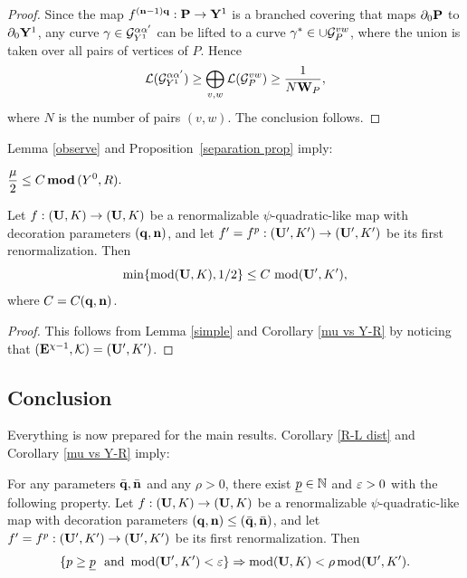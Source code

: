 \begin{proof}
   Since the map $f^{({\mathbf{n}}-1){\mathbf{q}}}: {\mathbf{P}}\rightarrow {\mathbf{Y}}^1$ is a branched covering
that maps $\partial_0{\mathbf{P}}$ to  $\partial_0{\mathbf{Y}}^1$, any curve
$\gamma\in {\mathcal G}_{Y^1}^{\alpha \alpha'}$ can be lifted to a curve
$\gamma^*\in \cup{\mathcal G}_P^{vw}$, where the union is taken over all pairs of vertices of $P$.
Hence
$$
 {\mathcal L} ({\mathcal G}_{Y^1}^{\alpha \alpha'}) \geq \bigoplus_{v,w} {\mathcal L}({\mathcal G}_P^{vw})\geq \frac{1}{N{\mathbf{W}}_P},
$$
where $N$ is the number of pairs $(v,w)$.
The conclusion follows.
\end{proof}

 Lemma \ref{observe} and Proposition~\ref{separation prop} imply:

\begin{cor}\label{mu vs Y-R}
   $\displaystyle{\frac{\mu}{2} \leq C\, { \mathbf{mod}\, }(Y^0, R).}$
\end{cor}


\begin{cor}\label{slow change}
Let $f: ({\mathbf{U}}, K)\rightarrow ({\mathbf{U}}, K)$ be a renormalizable $\psi$-quadratic-like map
with decoration  parameters $({\mathbf{q}}, {\mathbf{n}})$,
and let $f'=f^p : ({\mathbf{U}}', K')\rightarrow ({\mathbf{U}}',K')$ be its first renormalization.
Then
$$
      \min\{ \operatorname{mod} ({\mathbf{U}}, K), 1/2\} \leq C\,  \operatorname{mod}({\mathbf{U}}', K'),
$$
where $C=C({\mathbf{q}},{\mathbf{n}})$.
\end{cor}

\begin{proof}
  This follows from Lemma \ref{simple} and Corollary \ref{mu vs Y-R}
by noticing that $({\mathbf{E}}^{\chi-1}, {\mathcal K}) = ({\mathbf{U}}', K')$.
\end{proof}


\subsection{Conclusion}\label{conclusion}

Everything is now prepared for the main results.
 Corollary \ref{R-L dist} and Corollary \ref{mu vs Y-R} imply:

\begin{thm}\label{mod improve}
For any parameters $\bar{{\mathbf{q}}},\bar{{\mathbf{n}}}$ and any $\rho>0$,
 there exist  ${\underline p} \in {\Bbb N}$ and ${\varepsilon}>0$ with the following property.
Let $f: ({\mathbf{U}}, K)\rightarrow ({\mathbf{U}}, K)$ be a renormalizable $\psi$-quadratic-like map
with  decoration parameters $({\mathbf{q}},{\mathbf{n}})\leq (\bar{{\mathbf{q}}}, \bar{{\mathbf{n}}})$,
and let $f'=f^p : ({\mathbf{U}}', K')\rightarrow ({\mathbf{U}}',K')$ be its first renormalization.
Then
$$
 \{ p\geq \underline p\ \ \mathrm{and}\ \operatorname{mod}({\mathbf{U}}', K')< {\varepsilon} \}  \Rightarrow \operatorname{mod} ({\mathbf{U}}, K) < \rho \operatorname{mod}({\mathbf{U}}', K').
$$
\end{thm}

